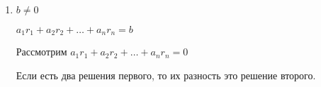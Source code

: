 \documentclass{book}
\theoremstyle{definition}
\newtheorem*{example}{Пример}
\begin{document}
\begin{enumerate}
\begin{example}
    $\begin{pmatrix} 1&1&0&-3&-1\\1&-1&2&-1&0\\4&-2&6&3&-4\\2&4&-2&4&-7 \end{pmatrix} \sim \begin{pmatrix} 1&1&0&-3&-1\\0&-2&2&2&1\\0&-6&6&15&0\\0&2&-2&10&-5 \end{pmatrix} \sim \begin{pmatrix} 1&1&0&-3&-1\\0&-2&2&2&1\\0&0&0&9&-3\\0&0&0&12&-4 \end{pmatrix} \sim \begin{pmatrix} 1&1&0&-3&-1\\0&-2&2&2&1\\0&0&0&3&-1\\0&0&0&0&0 \end{pmatrix}$ 

    Фиксируем первый, второй и четвёртый столбцы как базисные

    $\begin{cases}
        r_1+r_2-3r_4=r_5\\
        -2r_2+2r_4=-2r_3-r_5\\
        3r_4=r_5\\
    \end{cases}$ 

    Строим ФСР $r_3=0, r_5=3 \implies X_1\left( \frac{7}{2}, \frac{5}{2}. 0, 1, 3 \right)^T $ 

    $r_3=1, r_5=0 \implies  X_2\left(-1,1,1,0,0  \right)^T $

    $X = c_1\begin{pmatrix} \frac{7}{2} \\ \frac{5}{2} \\ 0\\1\\3 \end{pmatrix} +c_2\begin{pmatrix} -1\\1\\1\\0\\0 \end{pmatrix} $
\end{example}
    \item $b\neq 0$

        $a_1r_1+a_2r_2+\ldots + a_nr_n = b$

        Рассмотрим $a_1r_1+a_2r_2+\ldots + a_nr_n = 0$

        Если есть два решения первого, то их разность это решение второго.
\end{enumerate}
\end{document}
